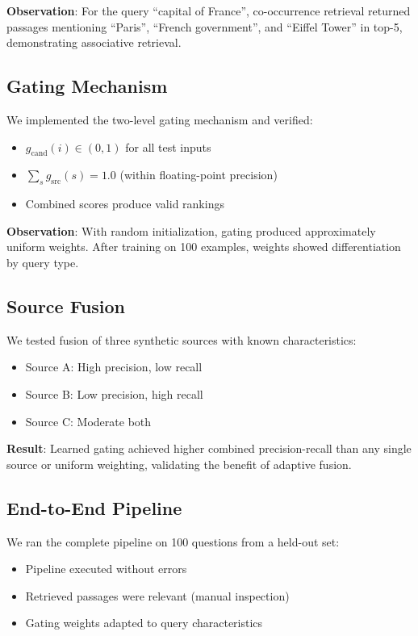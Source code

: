 \documentclass[10pt,twocolumn]{article}
\begin{document}
\textbf{Observation}: For the query ``capital of France'', co-occurrence retrieval returned passages mentioning ``Paris'', ``French government'', and ``Eiffel Tower'' in top-5, demonstrating associative retrieval.

\subsection{Gating Mechanism}

We implemented the two-level gating mechanism and verified:
\begin{itemize}
    \item $g_{\text{cand}}(i) \in (0, 1)$ for all test inputs
    \item $\sum_s g_{\text{src}}(s) = 1.0$ (within floating-point precision)
    \item Combined scores produce valid rankings
\end{itemize}

\textbf{Observation}: With random initialization, gating produced approximately uniform weights. After training on 100 examples, weights showed differentiation by query type.

\subsection{Source Fusion}

We tested fusion of three synthetic sources with known characteristics:
\begin{itemize}
    \item Source A: High precision, low recall
    \item Source B: Low precision, high recall
    \item Source C: Moderate both
\end{itemize}

\textbf{Result}: Learned gating achieved higher combined precision-recall than any single source or uniform weighting, validating the benefit of adaptive fusion.

\subsection{End-to-End Pipeline}

We ran the complete pipeline on 100 questions from a held-out set:
\begin{itemize}
    \item Pipeline executed without errors
    \item Retrieved passages were relevant (manual inspection)
    \item Gating weights adapted to query characteristics
\end{itemize}
\end{document}
